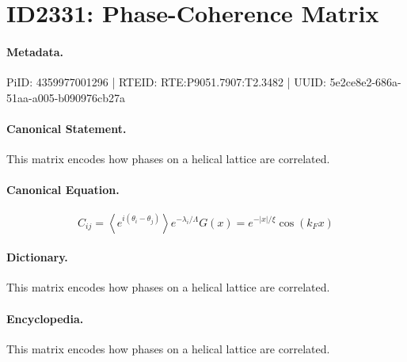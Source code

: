 \section*{ID2331: Phase-Coherence Matrix}
\paragraph{Metadata.}
PiID: 4359977001296 | RTEID: RTE:P9051.7907:T2.3482 | UUID: 5e2ce8e2-686a-51aa-a005-b090976cb27a

\paragraph{Canonical Statement.}
This matrix encodes how phases on a helical lattice are correlated.

\paragraph{Canonical Equation.}
\[
C_{ij} = \left\langle e^{i(\theta_i-\theta_j)} \right\rangle e^{-\lambda_i/\Lambda} G(x)= e^{-\lvert x\rvert/\xi}\cos(k_F x)
\]

\paragraph{Dictionary.}
This matrix encodes how phases on a helical lattice are correlated.

\paragraph{Encyclopedia.}
This matrix encodes how phases on a helical lattice are correlated.
